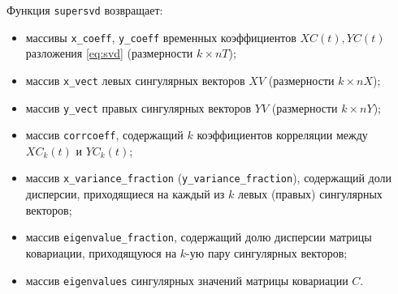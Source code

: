Функция \texttt{supersvd} возвращает: 
\begin{itemize}
	\item массивы \texttt{x\_coeff}, \texttt{y\_coeff}  временных коэффициентов $XC(t), YC(t)$ разложения \eqref{eq:svd} \big(раз\-мерности $k \times nT$\big);
	\item массив \texttt{x\_vect}  левых сингулярных векторов $XV$ \big(размерности $k \times nX$\big);
	\item массив \texttt{y\_vect} правых сингулярных векторов $YV$ \big(размерности $k \times nY$\big);
	\item массив \texttt{corrcoeff}, содержащий $k$ коэффициентов корреляции между $XC_k(t)$ и  $YC_k(t)$;
	\item массив \texttt{x\_variance\_fraction} (\texttt{y\_variance\_fraction}), содержащий доли дисперсии, приходящиеся на каждый из $k$ левых (правых) сингулярных векторов;
	\item массив \texttt{eigenvalue\_fraction}, содержащий долю дисперсии матрицы ковариации, приходящуюся на $k$-ую пару сингулярных векторов;
	\item массив \texttt{eigenvalues} сингулярных значений матрицы ковариации $C$.   
\end{itemize}
